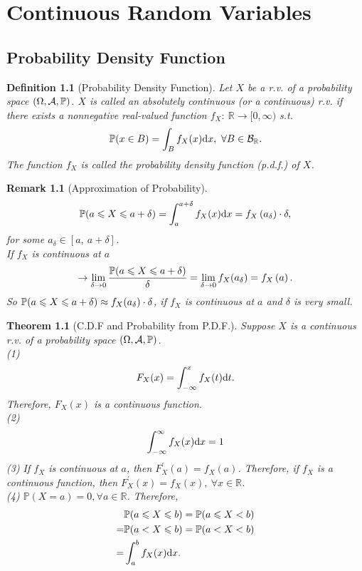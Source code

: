 \documentclass[openany,12pt]{book}
\newtheorem{theorem}{Theorem}[chapter]
\newtheorem{remark}{Remark}[chapter]
\newtheorem{definition}{Definition}[chapter]
\begin{document}
\chapter{Continuous Random Variables}
\section{Probability Density Function}

\begin{definition}[Probability Density Function]
Let $X$ be a r.v. of a probability space $(\Omega,\mathcal{A},\mathbb{P})$. $X$ is called an absolutely continuous (or a continuous) r.v. if there exists a nonnegative real-valued function $f_X:\ \mathbb{R}\to[0,\infty)$ s.t.
$$
\mathbb{P}(x\in B)=\int_{B}{f_X(x)\mathrm{d} x},\ \forall B\in \mathcal{B}_{\mathbb{R}}.
$$
The function $f_X$ is called the probability density function (p.d.f.) of $X$.
\end{definition}

\begin{remark}[Approximation of Probability]
$$
\mathbb{P}(a\leqslant X\leqslant a+\delta)=\int_{a}^{a+\delta}{f_X(x)\mathrm{d} x}=f_X\left(a_\delta\right)\cdot\delta,
$$
for some $a_\delta\in[a,\ a+\delta]$.\\
If $f_X$ is continuous at $a$
$$
\to\lim_{\delta\to0}{\frac{\mathbb{P}(a\leqslant X\leqslant a+\delta)}{\delta}}=\lim_{\delta\to0}{f_X(a_\delta)}=f_X\left(a\right).
$$
So $\mathbb{P}(a\leqslant X\leqslant a+\delta)\approx f_X(a_\delta)\cdot\delta$, if $f_X$ is continuous at $a$ and $\delta$ is very small.
\end{remark}

\begin{theorem}[C.D.F and Probability from P.D.F.]
Suppose $X$ is a continuous r.v. of a probability space $(\Omega,\mathcal{A},\mathbb{P})$.\\
(1)
$$
F_X(x)=\int_{-\infty}^{x}{f_X(t)\mathrm{d} t}.
$$
   Therefore, $F_X(x)$ is a continuous function.\\
(2)
$$
\int_{-\infty}^{\infty}{f_X(x)\mathrm{d} x}=1
$$
(3) If $f_X$ is continuous at $a$, then $F_X^\prime(a)=f_X(a)$. Therefore, if $f_X$ is a continuous function, then $F_X^\prime(x)=f_X(x),\ \forall x\in\mathbb{R}$.\\
(4) $\mathbb{P}(X=a)=0,\forall a\in\mathbb{R}$. Therefore,
$$\begin{aligned}
&\mathbb{P}(a\leqslant X\leqslant b)=\mathbb{P}(a\leqslant X<b)\\
=&\mathbb{P}(a<X\leqslant b)=\mathbb{P}(a<X<b)\\
=&\int_{a}^{b}{f_X(x)\mathrm{d} x}.
\end{aligned}
$$
\end{theorem}
\end{document}

